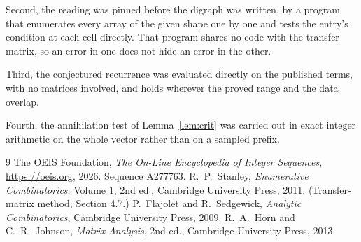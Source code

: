 \documentclass[11pt,a4paper]{article}
\theoremstyle{plain}
\theoremstyle{definition}
\begin{document}
Second, the reading was pinned before the digraph was written, by a program that enumerates
every array of the given shape one by one and tests the entry's condition at each cell
directly. That program shares no code with the transfer matrix, so an error in one does not
hide an error in the other.

Third, the conjectured recurrence was evaluated directly on the published terms, with no
matrices involved, and holds wherever the proved range and the data overlap.

Fourth, the annihilation test of Lemma~\ref{lem:crit} was carried out in exact integer
arithmetic on the whole vector rather than on a sampled prefix.

\begin{thebibliography}{9}
 The OEIS Foundation, \emph{The On-Line Encyclopedia of Integer
Sequences}, \url{https://oeis.org}, 2026. Sequence A277763.
 R.~P.~Stanley, \emph{Enumerative Combinatorics}, Volume 1, 2nd ed.,
Cambridge University Press, 2011. (Transfer-matrix method, Section 4.7.)
 P.~Flajolet and R.~Sedgewick, \emph{Analytic Combinatorics}, Cambridge
University Press, 2009.
 R.~A.~Horn and C.~R.~Johnson, \emph{Matrix Analysis}, 2nd ed., Cambridge
University Press, 2013.
\end{thebibliography}
\end{document}
